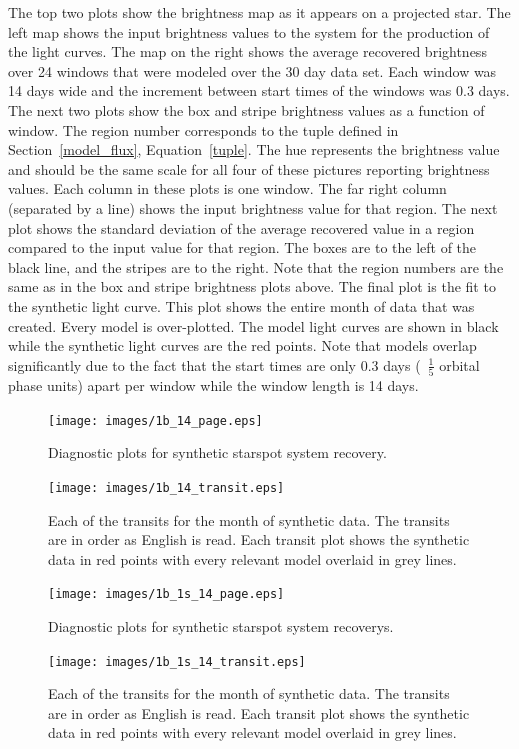The top two plots show the brightness map as it appears on a projected star. The left map shows the input brightness values to the system for the production of the light curves. The map on the right shows the average recovered brightness over 24 windows that were modeled over the 30 day data set. Each window was 14 days wide and the increment between start times of the windows was 0.3 days. The next two plots show the box and stripe brightness values as a function of window. The region number corresponds to the tuple defined in Section~\ref{model_flux}, Equation~\ref{tuple}. The hue represents the brightness value and should be the same scale for all four of these pictures reporting brightness values. Each column in these plots is one window. The far right column (separated by a line) shows the input brightness value for that region. The next plot shows the standard deviation of the average recovered value in a region compared to the input value for that region. The boxes are to the left of the black line, and the stripes are to the right. Note that the region numbers are the same as in the box and stripe brightness plots above. The final plot is the fit to the synthetic light curve. This plot shows the entire month of data that was created. Every model is over-plotted. The model light curves are shown in black while the synthetic light curves are the red points. Note that models overlap significantly due to the fact that the start times are only 0.3 days (~$\frac{1}{5}$ orbital phase units) apart per window while the window length is 14 days.

\clearpage
\begin{figure}
	\texttt{[image: images/1b\_14\_page.eps]}
	\caption{Diagnostic plots for synthetic starspot system recovery.}
	\label{page_1b}
\end{figure}
\clearpage
\begin{figure}
	\texttt{[image: images/1b\_14\_transit.eps]}
	\caption{Each of the transits for the month of synthetic data. The transits are in order as English is read. Each transit plot shows the synthetic data in red points with every relevant model overlaid in grey lines.}
	\label{transits_1b}
\end{figure}

\clearpage
\begin{figure}
	\texttt{[image: images/1b\_1s\_14\_page.eps]}
	\caption{Diagnostic plots for synthetic starspot system recoverys.}
	\label{page_1b_1s}
\end{figure}
\clearpage
\begin{figure}
	\texttt{[image: images/1b\_1s\_14\_transit.eps]}
	\caption{Each of the transits for the month of synthetic data. The transits are in order as English is read. Each transit plot shows the synthetic data in red points with every relevant model overlaid in grey lines.}
	\label{transits_1b_1s}
\end{figure}

